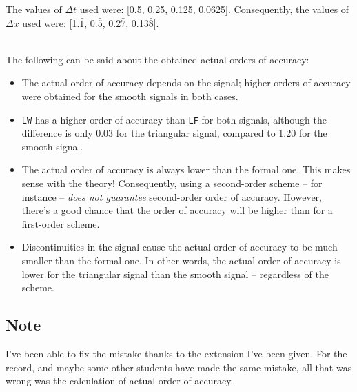 The values of $\Delta t$ used were: [0.5, 0.25, 0.125, 0.0625]. Consequently, the values of $\Delta x$ used were: [1.$\bar{1}$, 0.$\bar{5}$, 0.2$\bar{7}$, 0.13$\bar{8}$].
%
\noindent\par
\noindent{}\\[1cm]
%
The following can be said about the obtained actual orders of accuracy:
\begin{itemize}[nolistsep]
    \item The actual order of accuracy depends on the signal; higher orders of accuracy were obtained for the smooth signals in both cases.
    \item \texttt{LW} has a higher order of accuracy than \texttt{LF} for both signals, although the difference is only 0.03 for the triangular signal, compared to 1.20 for the smooth signal.
    \item The actual order of accuracy is always lower than the formal one. This makes sense with the theory! Consequently, using a second-order scheme -- for instance -- \emph{does not guarantee} second-order order of accuracy. However, there's a good chance that the order of accuracy will be higher than for a first-order scheme.
    \item Discontinuities in the signal cause the actual order of accuracy to be much smaller than the formal one. In other words, the actual order of accuracy is lower for the triangular signal than the smooth signal -- regardless of the scheme.
\end{itemize}

\subsection*{Note}
I've been able to fix the mistake thanks to the extension I've been given. For the record, and maybe some other students have made the same mistake, all that was wrong was the calculation of actual order of accuracy.

